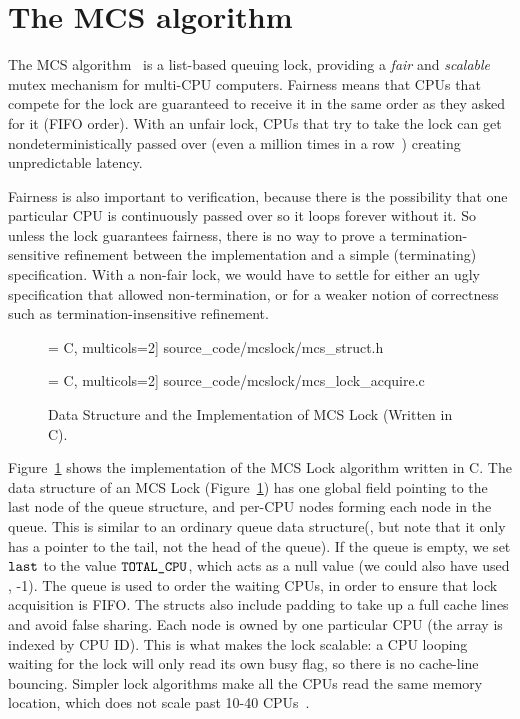 \section{The MCS algorithm}
\label{chapter:mcslock:sec:overview}

The MCS algorithm~\cite{mcs91} is a list-based queuing lock,
providing a \emph{fair} and \emph{scalable} mutex mechanism for
multi-CPU computers. Fairness means that
CPUs that compete for the lock are guaranteed to receive it in the same
order as they asked for it (FIFO order). With an unfair lock, CPUs
that try to take the lock can get nondeterministically passed over
(even a million times in a row~\cite{lwn:ticketlocks}) creating
unpredictable latency.

Fairness is also important to verification, because
there is the possibility that one particular CPU is continuously
passed over so it loops forever without it.
So unless the lock
guarantees fairness, there is no way to prove a termination-sensitive
refinement between the implementation and a simple (terminating)
specification. With a non-fair lock, we would have to settle for
either an ugly specification that allowed non-termination, or for a
weaker notion of correctness such as termination-insensitive
refinement.
\begin{figure}
 = C, multicols=2] {source_code/mcslock/mcs_struct.h}
\vspace{1em}

 = C, multicols=2] {source_code/mcslock/mcs_lock_acquire.c}
\caption{Data Structure and the Implementation of MCS Lock (Written in C).}
\label{fig:chapter:mcslock:mcs_lock}
\end{figure}

Figure~\ref{fig:chapter:mcslock:mcs_lock} shows the implementation of the MCS Lock algorithm written in C. 
The data structure of an MCS Lock (Figure~\ref{fig:chapter:mcslock:mcs_lock}) has
one global field pointing to the last node of the queue structure, and
per-CPU nodes forming each node in the queue. This is similar to an
ordinary queue data structure(, but note that it only has a
pointer to the tail, not the head of the queue).  If the queue is
empty, we set ${\mathrm{\texttt{last}}}$ to the value ${\mathrm{\texttt{TOTAL\_CPU}}}$, which
acts as a null value (we could also have used \eg, -1). The queue is
used to order the waiting CPUs, in order to ensure that lock
acquisition is FIFO. The structs also include padding to take up a
full cache lines and avoid false sharing.  Each node is owned by one
particular CPU (the array is indexed by CPU ID).  This is what makes
the lock scalable: a CPU looping waiting for the lock will only read
its own busy flag, so there is no cache-line bouncing. Simpler lock
algorithms make all the CPUs read the same memory location, which does
not scale past 10-40 CPUs~\cite{Boyd-wickizer12}.

